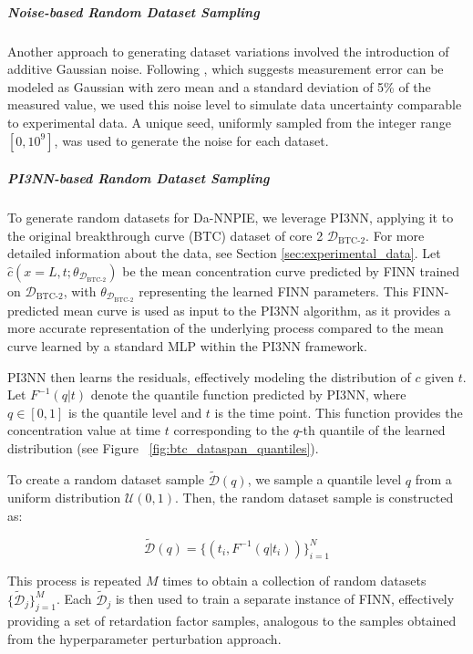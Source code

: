 \subparagraph{Noise-based Random Dataset Sampling}

Another approach to generating dataset variations involved the introduction of additive Gaussian noise. Following \cite{nowak2016entropy}, which suggests measurement error can be modeled as Gaussian with zero mean and a standard deviation of 5\% of the measured value, we used this noise level to simulate data uncertainty comparable to experimental data.
A unique seed, uniformly sampled from the integer range $[0, 10^9]$, was used to generate the noise for each dataset. %


\subparagraph{PI3NN-based Random Dataset Sampling}
\label{sec:random_dataset_sampling}
To generate random datasets for Da-NNPIE, we leverage PI3NN, applying it to the original breakthrough curve (BTC) dataset of core 2 $\mathcal{D}_{\text{BTC-2}}$. For more detailed information about the data, see Section \vref{sec:experimental_data}.
Let $\hat{c}(x=L, t; \theta_{\mathcal{D}_{\text{BTC-2}}})$ be the mean concentration curve predicted by FINN trained on $\mathcal{D}_{\text{BTC-2}}$, with $\theta_{\mathcal{D}_{\text{BTC-2}}}$ representing the learned FINN parameters. This FINN-predicted mean curve is used as input to the PI3NN algorithm, as it provides a more accurate representation of the underlying process compared to the mean curve learned by a standard MLP within the PI3NN framework.

PI3NN then learns the residuals, effectively modeling the distribution of $c$ given $t$. Let $F^{-1}(q | t)$ denote the quantile function predicted by PI3NN, where $q \in [0, 1]$ is the quantile level and $t$ is the time point. This function provides the concentration value at time $t$ corresponding to the $q$-th quantile of the learned distribution (see Figure ~\vref{fig:btc_dataspan_quantiles}).

To create a random dataset sample $\tilde{\mathcal{D}}(q)$, we sample a quantile level $q$ from a uniform distribution $\mathcal{U}(0, 1)$. Then, the random dataset sample is constructed as:

$$
\tilde{\mathcal{D}}(q) = \{ (t_i, F^{-1}(q | t_i) ) \}_{i=1}^N
$$

This process is repeated $M$ times to obtain a collection of random datasets $\{\tilde{\mathcal{D}}_j\}_{j=1}^M$. Each $\tilde{\mathcal{D}}_j$ is then used to train a separate instance of FINN, effectively providing a set of retardation factor samples, analogous to the samples obtained from the hyperparameter perturbation approach.

